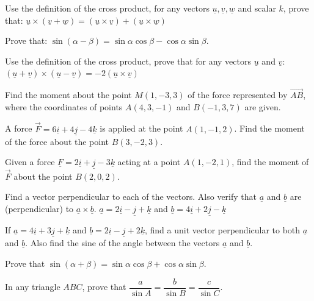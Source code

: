 \documentclass[11pt,a4paper]{article}
\begin{document}
\begin{longlist}
\item Use the definition of the cross product, for any vectors $\underline{u},\underline{v},\underline{w}$ and scalar $k$, prove that: $\underline{u}\times(\underline{v}+\underline{w})=(\underline{u}\times\underline{v}) + (\underline{u}\times\underline{w})$

\item Prove that: $\sin(\alpha-\beta)=\sin\alpha\cos\beta - \cos\alpha\sin\beta$.

\item Use the definition of the cross product, prove that for any vectors $\underline{u}$ and $\underline{v}$: $(\underline{u}+\underline{v})\times(\underline{u}-\underline{v})=-2(\underline{u}\times\underline{v})$

\item Find the moment about the point $M(1,-3,3)$ of the force represented by $\overrightarrow{AB}$, where the coordinates of points $A(4,3,-1)$ and $B(-1,3,7)$ are given.

\item A force $\vec{F} = 6\underline{i}+4\underline{j}-4\underline{k}$ is applied at the point $A(1,-1,2)$. Find the moment of the force about the point $B(3,-2,3)$.

\item Given a force $\underline{F}=2\underline{i}+\underline{j}-3\underline{k}$ acting at a point $A(1,-2,1)$, find the moment of $\vec{F}$ about the point $B(2,0,2)$.

\item Find a vector perpendicular to each of the vectors. Also verify that $\underline{a}$ and $\underline{b}$ are (perpendicular) to $\underline{a}\times\underline{b}$. $\underline{a}=2\underline{i}-\underline{j}+\underline{k}$ and $\underline{b}=4\underline{i}+2\underline{j}-\underline{k}$

\item If $\underline{a}=4\underline{i}+3\underline{j}+\underline{k}$ and $\underline{b}=2\underline{i}-\underline{j}+2\underline{k}$, find a unit vector perpendicular to both $\underline{a}$ and $\underline{b}$. Also find the sine of the angle between the vectors $\underline{a}$ and $\underline{b}$.

\item Prove that $\sin(\alpha+\beta)=\sin\alpha\cos\beta + \cos\alpha\sin\beta$.

\item In any triangle $ABC$, prove that $\dfrac{a}{\sin A} = \dfrac{b}{\sin B} = \dfrac{c}{\sin C}$.


\end{longlist}
\end{document}
